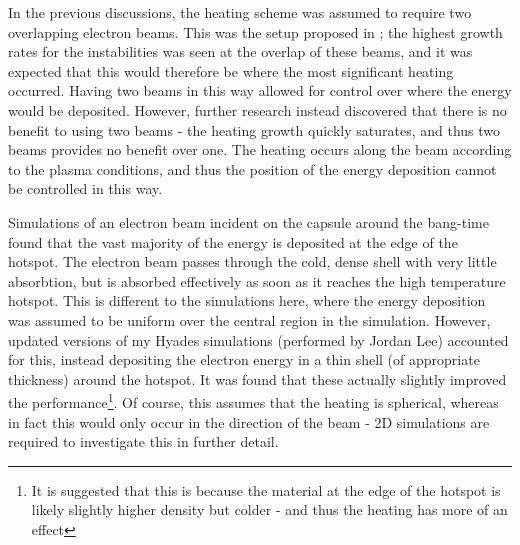 In the previous discussions, the heating scheme was assumed to require two overlapping electron beams. This was the setup proposed in \cite{Ratan2017}; the highest growth rates for the instabilities was seen at the overlap of these beams, and it was expected that this would therefore be where the most significant heating occurred. Having two beams in this way allowed for control over where the energy would be deposited. However, further research instead discovered that there is no benefit to using two beams - the heating growth quickly saturates, and thus two beams provides no benefit over one. The heating occurs along the beam according to the plasma conditions, and thus the position of the energy deposition cannot be controlled in this way.

Simulations of an electron beam incident on the capsule around the bang-time found that the vast majority of the energy is deposited  at the edge of the hotspot. The electron beam passes through the cold, dense shell with very little absorbtion, but is absorbed effectively as soon as it reaches the high temperature hotspot. This is different to the simulations here, where the energy deposition was assumed to be uniform over the central region in the simulation. However, updated versions of my Hyades simulations (performed by Jordan Lee) accounted for this, instead depositing the electron energy in a thin shell (of appropriate thickness) around the hotspot. It was found that these actually slightly improved the performance\footnote{It is suggested that this is because the material at the edge of the hotspot is likely slightly higher density but colder - and thus the heating has more of an effect}. Of course, this assumes that the heating is spherical, whereas in fact this would only occur in the direction of the beam - 2D simulations are required to investigate this in further detail.





